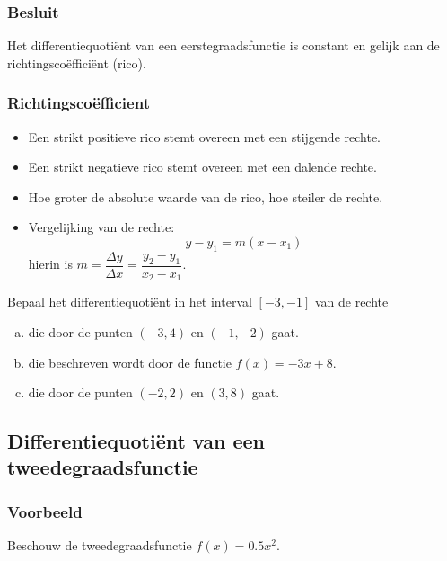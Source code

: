 \documentclass[12pt]{article}
\begin{document}
\subsubsection{Besluit}

Het differentiequotiënt van een eerstegraadsfunctie is constant en gelijk aan de richtingscoëfficiënt (rico).

\subsubsection{Richtingscoëfficient}
\begin{itemize}
  \item Een strikt positieve rico stemt overeen met een stijgende rechte.
  \item Een strikt negatieve rico stemt overeen met een dalende rechte.
  \item Hoe groter de absolute waarde van de rico, hoe steiler de rechte.
  \item Vergelijking van de rechte:
  $$y-y_1=m(x-x_1)$$
  hierin is $m=\dfrac{\Delta y}{\Delta x}=\dfrac{y_2-y_1}{x_2-x_1}$.
\end{itemize}

\begin{oefening}
Bepaal het differentiequotiënt in het interval $[-3,-1]$ van de rechte
\begin{enumerate}[(a)]
  \item die door de punten $(-3, 4)$ en $(-1, -2)$ gaat.
  \item die beschreven wordt door de functie $f(x)=-3x+8$.
  \item die door de punten $(-2, 2)$ en $(3, 8)$ gaat.
\end{enumerate}
\end{oefening}

\pagebreak
\subsection{Differentiequotiënt van een tweedegraadsfunctie}

\subsubsection{Voorbeeld}

Beschouw de tweedegraadsfunctie $f(x)=0.5x^2$.
\end{document}
